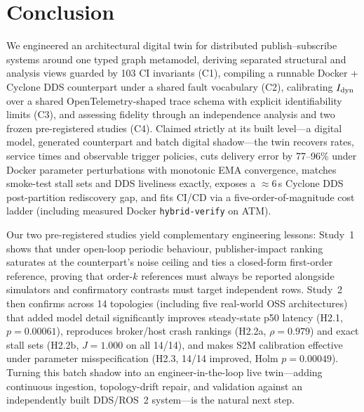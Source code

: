 \section{Conclusion}
\label{sec:conclusion}

We engineered an architectural digital twin for distributed publish--subscribe systems around one typed graph metamodel, deriving separated structural and analysis views guarded by 103 CI invariants (C1), compiling a runnable Docker + Cyclone DDS counterpart under a shared fault vocabulary (C2), calibrating $I_{\mathrm{dyn}}$ over a shared OpenTelemetry-shaped trace schema with explicit identifiability limits (C3), and assessing fidelity through an independence analysis and two frozen pre-registered studies (C4). Claimed strictly at its built level---a digital model, generated counterpart and batch digital shadow---the twin recovers rates, service times and observable trigger policies, cuts delivery error by 77--96\% under Docker parameter perturbations with monotonic EMA convergence, matches smoke-test stall sets and DDS liveliness exactly, exposes a $\approx 6$\,s Cyclone DDS post-partition rediscovery gap, and fits CI/CD via a five-order-of-magnitude cost ladder (including measured Docker \texttt{hybrid-verify} on ATM).

Our two pre-registered studies yield complementary engineering lessons: Study~1 shows that under open-loop periodic behaviour, publisher-impact ranking saturates at the counterpart's noise ceiling and ties a closed-form first-order reference, proving that order-$k$ references must always be reported alongside simulators and confirmatory contrasts must target independent rows. Study~2 then confirms across 14 topologies (including five real-world OSS architectures) that added model detail significantly improves steady-state p50 latency (H2.1, $p = 0.00061$), reproduces broker/host crash rankings (H2.2a, $\rho = 0.979$) and exact stall sets (H2.2b, $J = 1.000$ on all 14/14), and makes S2M calibration effective under parameter misspecification (H2.3, 14/14 improved, Holm $p = 0.00049$). Turning this batch shadow into an engineer-in-the-loop live twin---adding continuous ingestion, topology-drift repair, and validation against an independently built DDS/ROS~2 system---is the natural next step.
